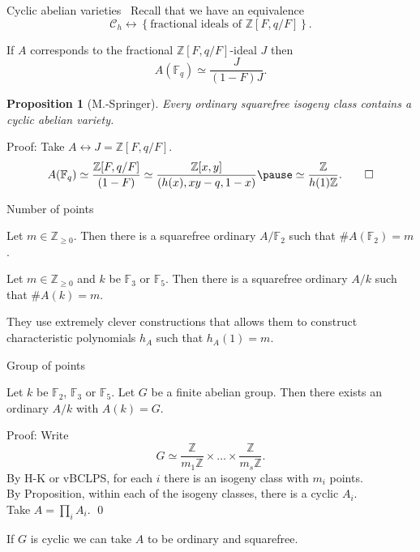 \documentclass[usenames,dvipsnames]{beamer}
\def\Z{\mathbb{Z}}
\def\F{\mathbb{F}}
\newcommand{\cC}{{\mathcal C}}
\newcommand{\set}[1]{\left\lbrace#1\right\rbrace }
\newtheorem{prop}[df]{Proposition}
\begin{document}
\begin{frame}{ Cyclic abelian varieties }\
    Recall that we have an equivalence
    \[ \cC_h \longleftrightarrow \set{\text{fractional ideals of $\Z[F,q/F]$}}. \]
    \pause
    \vspace{-0.5cm}
    \begin{corollary}
        If $A$ corresponds to the fractional $\Z[F,q/F]$-ideal $J$ then
    \pause
        \vspace{-0.2cm}
        \[ A(\F_q) \simeq \frac{J}{(1-F)J}.\]
    \end{corollary}
    \pause
    \begin{prop}[M.-Springer]
        Every ordinary squarefree isogeny class contains a cyclic abelian variety.
    \end{prop}
    \pause
	Proof: Take $A\longleftrightarrow J=\Z[F,q/F]$.
    \pause
    \[ A(\F_q)\simeq \frac{\Z[F,q/F]}{(1-F)} \simeq \frac{\Z[x,y]}{(h(x),xy-q,1-x)}
    \pause
    \simeq \frac{\Z}{h(1)\Z}.\qed \]
\end{frame}

\begin{frame}{ Number of points }
    \begin{theorem}
        Let $m\in\Z_{\geq 0}$. Then there is a squarefree ordinary $A/\F_2$ such that $\#A(\F_2)=m$.
    \end{theorem}
    \pause
    \begin{theorem}
        Let $m\in\Z_{\geq 0}$ and $k$ be $\F_3$ or $\F_5$. Then there is a squarefree ordinary $A/k$ such that $\#A(k)=m$.
    \end{theorem}
    \pause
    They use extremely clever constructions that allows them to construct characteristic polynomials $h_A$ such that $h_A(1)=m$.
\end{frame}

\begin{frame}{ Group of points }
    \begin{theorem}[M.-Springer]
        Let $k$ be $\F_2$, $\F_3$ or $\F_5$. Let $G$ be a finite abelian group.
        \pause
        Then there exists an ordinary $A/k$ with $A(k) = G$.
    \end{theorem}
    \pause
    Proof: Write
    \[ G\simeq \frac{\Z}{m_1 \Z} \times \ldots \times \frac{\Z}{m_s \Z}.\]
    \pause
    By H-K or vBCLPS, for each $i$ there is an isogeny class with $m_i$ points.\\
    \pause
    By Proposition, within each of the isogeny classes, there is a cyclic $A_i$.\\
    \pause
    Take $A=\prod_i A_i$. \qed
    \pause
    \begin{corollary}
        If $G$ is cyclic we can take $A$ to be ordinary and squarefree.
    \end{corollary}
\end{frame}
\end{document}
